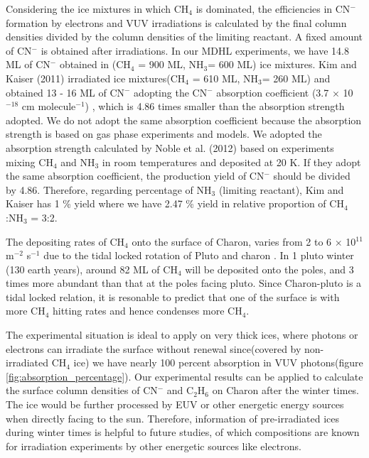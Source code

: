 Considering the ice mixtures in which CH$_4$ is dominated, the efficiencies in CN$^-$ formation by electrons and VUV irradiations is calculated by the final column densities divided by the column densities of the limiting reactant. A fixed amount of CN$^-$ is obtained after irradiations. In our MDHL experiments, we have 14.8 ML of CN$^-$ obtained in (CH$_4$ = 900 ML, NH$_3$= 600 ML) ice mixtures. Kim and Kaiser (2011) irradiated  ice mixtures(CH$_4$ = 610 ML, NH$_3$= 260 ML) and obtained 13 - 16 ML of CN$^-$ adopting the CN$^-$ absorption coefficient (3.7 $\times$ 10$^{-18}$ cm molecule$^{-1}$) \cite{georgieva2006computational}, which is 4.86 times smaller than the absorption strength adopted. We do not adopt the same absorption coefficient because the absorption strength is based on gas phase experiments and models. We adopted the absorption strength calculated by Noble et al. (2012) \cite{noble2012thermal} based on experiments mixing CH$_4$ and NH$_3$ in room temperatures and deposited at 20 K. If they adopt the same absorption coefficient, the production yield of CN$^-$ should be divided by 4.86. Therefore, regarding percentage of NH$_3$ (limiting reactant), Kim and Kaiser has 1 \% yield where we have 2.47 \% yield in relative proportion of CH$_4$:NH$_3$ = 3:2.

The depositing rates of CH$_4$ onto the surface of Charon, varies from 2 to 6 $\times$ 10$^{11}$ m$^{-2}$ s$^{-1}$ due to the tidal locked rotation of Pluto and charon \cite{hoey201}. In 1 pluto winter (130 earth years), around 82 ML of CH$_4$ will be deposited onto the poles, and 3 times more abundant than that at the poles facing pluto. Since Charon-pluto is a tidal locked relation, it is resonable to predict that one of the surface is with more CH$_4$ hitting rates and hence condenses more CH$_4$.

The experimental situation is ideal to apply on very thick ices, where photons or electrons can irradiate the surface without renewal since(covered by non-irradiated CH$_4$ ice) we have nearly 100 percent absorption in VUV photons(figure \ref{fig:absorption_percentage}). Our experimental results can be applied to calculate the surface column densities of CN$^-$ and C$_2$H$_6$ on Charon after the winter times. The ice would be further processed by EUV or other energetic energy sources when directly facing to the sun. Therefore, information of pre-irradiated ices during winter times is helpful to future studies, of which compositions are known for irradiation experiments by other energetic sources like electrons.\\

